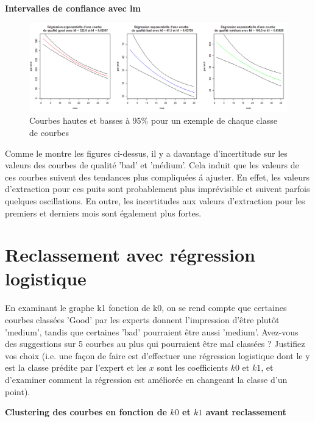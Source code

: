 \documentclass[12pt]{article}
\begin{document}
\textbf{Intervalles de confiance avec lm}

\begin{figure}[H]
 \centering %
	\includegraphics[width=430px]{q3_predict_lm}
  \caption{\label{fig:q3_predict_lm} Courbes hautes et basses à 95\% pour un exemple de chaque classe de courbes}
\end{figure}

Comme le montre les figures ci-dessus, il y a davantage d'incertitude sur les valeurs des courbes de qualit\'e 'bad' et 'm\'edium'. Cela induit que les valeurs de ces courbes suivent des tendances plus compliqu\'ees \'a ajuster. En effet, les valeurs d'extraction pour ces puits sont probablement plus impr\'evisible et suivent parfois quelques oscillations. En outre, les incertitudes aux valeurs d'extraction pour les premiers et derniers mois sont \'egalement plus fortes. 


\newpage
\section{Reclassement avec r\'egression logistique}
 
En examinant le graphe k1 fonction de k0, on se rend compte que certaines courbes
class\'ees 'Good' par les experts donnent l'impression d'\^etre plut\^ot 'medium', tandis que
certaines 'bad' pourraient \^etre aussi 'medium'. 
\newline
Avez-vous des suggestions sur 5 courbes au
plus qui pourraient \^etre mal class\'ees ? 
\newline
Justifiez vos choix (i.e. une fa\c con de faire est d'effectuer une r\'egression logistique dont le y est la classe pr\'edite par l'expert et les $x$ sont les coefficients $k0$ et $k1$, et d'examiner comment la r\'egression est am\'elior\'ee en changeant la
classe d'un point).

\textbf{Clustering des courbes en fonction de $k0$ et $k1$ avant reclassement}
\end{document}
